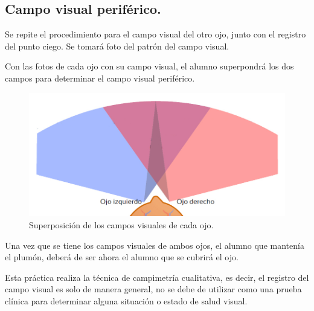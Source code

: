 \documentclass[14pt]{extarticle}
\begin{document}
\subsection{Campo visual periférico.}

Se repite el procedimiento para el campo visual del otro ojo, junto con el registro del punto ciego. Se tomará foto del patrón del campo visual.

Con las fotos de cada ojo con su campo visual, el alumno superpondrá los dos campos para determinar el campo visual periférico.

\begin{figure}[H]
     \centering
     \includegraphics[scale=0.45]{Imagenes/Campo_visual_01.jpg}
     \caption{Superposición de los campos visuales de cada ojo.}
\end{figure}

Una vez que se tiene los campos visuales de ambos ojos, el alumno que mantenía el plumón, deberá de ser ahora el alumno que se cubrirá el ojo.
\par
Esta práctica realiza la técnica de campimetría cualitativa, es decir, el registro del campo visual es solo de manera general, no se debe de utilizar como una prueba clínica para determinar alguna situación o estado de salud visual.
\end{document}
